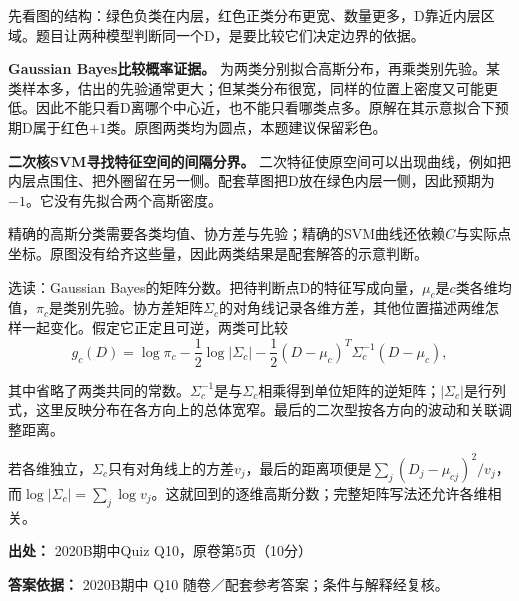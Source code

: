 先看图的结构：绿色负类在内层，红色正类分布更宽、数量更多，D靠近内层区域。题目让两种模型判断同一个D，是要比较它们决定边界的依据。


\textbf{Gaussian Bayes比较概率证据。} 为两类分别拟合高斯分布，再乘类别先验。某类样本多，估出的先验通常更大；但某类分布很宽，同样的位置上密度又可能更低。因此不能只看D离哪个中心近，也不能只看哪类点多。原解在其示意拟合下预期D属于红色\(+1\)类。原图两类均为圆点，本题建议保留彩色。


\textbf{二次核SVM寻找特征空间的间隔分界。} 二次特征使原空间可以出现曲线，例如把内层点围住、把外圈留在另一侧。配套草图把D放在绿色内层一侧，因此预期为\(-1\)。它没有先拟合两个高斯密度。


精确的高斯分类需要各类均值、协方差与先验；精确的SVM曲线还依赖\(C\)与实际点坐标。原图没有给齐这些量，因此两类结果是配套解答的示意判断。


选读：Gaussian Bayes的矩阵分数。把待判断点D的特征写成向量，\(\mu_c\)是\(c\)类各维均值，\(\pi_c\)是类别先验。协方差矩阵\(\Sigma_c\)的对角线记录各维方差，其他位置描述两维怎样一起变化。假定它正定且可逆，两类可比较
\[
g_c(D)=\log\pi_c-\frac12\log|\Sigma_c|
-\frac12(D-\mu_c)^T\Sigma_c^{-1}(D-\mu_c),
\]


其中省略了两类共同的常数。\(\Sigma_c^{-1}\)是与\(\Sigma_c\)相乘得到单位矩阵的逆矩阵；\(|\Sigma_c|\)是行列式，这里反映分布在各方向上的总体宽窄。最后的二次型按各方向的波动和关联调整距离。


若各维独立，\(\Sigma_c\)只有对角线上的方差\(v_j\)，最后的距离项便是\(\sum_j(D_j-\mu_{cj})^2/v_j\)，而\(\log|\Sigma_c|=\sum_j\log v_j\)。这就回到的逐维高斯分数；完整矩阵写法还允许各维相关。


\textbf{出处：} 2020B期中Quiz Q10，原卷第5页（10分）


\textbf{答案依据：} 2020B期中 Q10 随卷／配套参考答案；条件与解释经复核。
